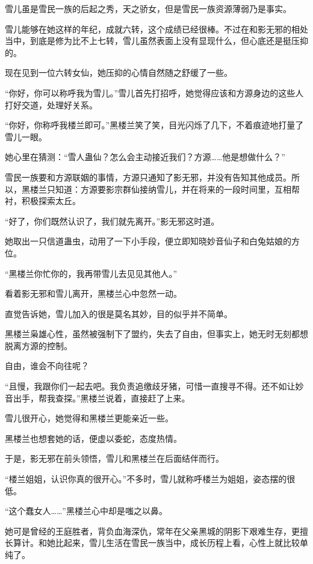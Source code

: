 
\begin{this_body}

雪儿虽是雪民一族的后起之秀，天之骄女，但是雪民一族资源薄弱乃是事实。

雪儿能够在她这样的年纪，成就六转，这个成绩已经很棒。不过在和影无邪的相处当中，到底是修为比不上七转，雪儿虽然表面上没有显现什么，但心底还是挺压抑的。

现在见到一位六转女仙，她压抑的心情自然随之舒缓了一些。

“你好，你可以称呼我为雪儿。”雪儿首先打招呼，她觉得应该和方源身边的这些人打好交道，处理好关系。

“你好，你称呼我楼兰即可。”黑楼兰笑了笑，目光闪烁了几下，不着痕迹地打量了雪儿一眼。

她心里在猜测：“雪人蛊仙？怎么会主动接近我们？方源……他是想做什么？”

雪民一族要和方源联姻的事情，方源只通知了影无邪，并没有告知其他成员。所以，黑楼兰只知道：方源要影宗群仙接纳雪儿，并在将来的一段时间里，互相帮衬，积极探索太丘。

“好了，你们既然认识了，我们就先离开。”影无邪这时道。

她取出一只信道蛊虫，动用了一下小手段，便立即知晓妙音仙子和白兔姑娘的方位。

“黑楼兰你忙你的，我再带雪儿去见见其他人。”

看着影无邪和雪儿离开，黑楼兰心中忽然一动。

直觉告诉她，雪儿加入的很是莫名其妙，目的似乎并不简单。

黑楼兰枭雄心性，虽然被强制下了盟约，失去了自由，但事实上，她无时无刻都想脱离方源的控制。

自由，谁会不向往呢？

“且慢，我跟你们一起去吧。我负责追缴歧牙猪，可惜一直搜寻不得。还不如让妙音出手，帮我查探。”黑楼兰说着，直接赶了上来。

雪儿很开心，她觉得和黑楼兰更能亲近一些。

黑楼兰也想套她的话，便虚以委蛇，态度热情。

于是，影无邪在前头领悟，雪儿和黑楼兰在后面结伴而行。

“楼兰姐姐，认识你真的很开心。”不多时，雪儿就称呼楼兰为姐姐，姿态摆的很低。

“这个蠢女人……”黑楼兰心中却是嗤之以鼻。

她可是曾经的王庭胜者，背负血海深仇，常年在父亲黑城的阴影下艰难生存，更擅长算计。和她比起来，雪儿生活在雪民一族当中，成长历程上看，心性上就比较单纯了。


\end{this_body}

